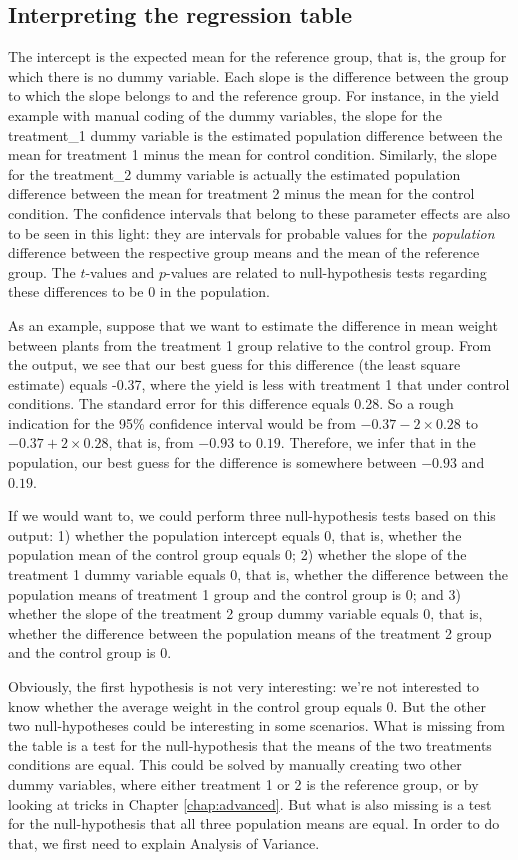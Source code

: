 \documentclass[]{book}\usepackage[]{graphicx}\usepackage[]{color}
\begin{document}
\subsection{Interpreting the regression table}

The intercept is the expected mean for the reference group, that is, the group for which there is no dummy variable. Each slope is the difference between the group to which the slope belongs to and the reference group. For instance, in the yield example with manual coding of the dummy variables, the slope for the treatment\_1 dummy variable is the estimated population difference between the mean for treatment 1 minus the mean for control condition. Similarly, the slope for the treatment\_2 dummy variable is actually the estimated population difference between the mean for treatment 2 minus the mean for the control condition. The confidence intervals that belong to these parameter effects are also to be seen in this light: they are intervals for probable values for the \textit{population} difference between the respective group means and the mean of the reference group. The $t$-values and $p$-values are related to null-hypothesis tests regarding these differences to be 0 in the population.

As an example, suppose that we want to estimate the difference in mean weight between plants from the treatment 1 group relative to the control group. From the output, we see that our best guess for this difference (the least square estimate) equals -0.37, where the yield is less with treatment 1 that under control conditions. The standard error for this difference equals 0.28. So a rough indication for the 95\% confidence interval would be from $-0.37- 2 \times 0.28$ to $-0.37 + 2\times 0.28$, that is, from $-0.93$ to $0.19$. Therefore, we infer that in the population, our best guess for the difference is somewhere between $-0.93$ and $0.19$.

If we would want to, we could perform three null-hypothesis tests based on this output: 1) whether the population intercept equals 0, that is, whether the population mean of the control group equals 0; 2) whether the slope of the treatment 1 dummy variable equals 0, that is, whether the difference between the population means of treatment 1 group and the control group is 0; and 3) whether the slope of the treatment 2 group dummy variable equals 0, that is, whether the difference between the population means of the treatment 2 group and the control group is 0.

Obviously, the first hypothesis is not very interesting: we're not interested to know whether the average weight in the control group equals 0. But the other two null-hypotheses could be interesting in some scenarios. What is missing from the table is a test for the null-hypothesis that the means of the two treatments conditions are equal. This could be solved by manually creating two other dummy variables, where either treatment 1 or 2 is the reference group, or by looking at tricks in Chapter \ref{chap:advanced}. But what is also missing is a test for the null-hypothesis that all three population means are equal. In order to do that, we first need to explain Analysis of Variance.
\end{document}
